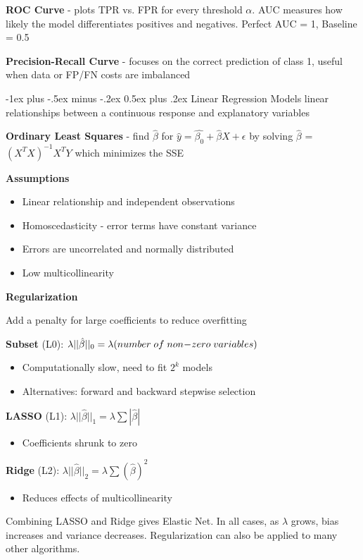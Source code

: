\documentclass[10pt,landscape]{article}
\makeatletter
\renewcommand{\section}{\@startsection{section}{1}{0mm}%
                                {-1ex plus -.5ex minus -.2ex}%
                                {0.5ex plus .2ex}%
                                {\normalfont\large\bfseries}}
\makeatother
\begin{document}
\begin{multicols}{3}
\textbf{ROC Curve} - plots TPR vs. FPR for every threshold $\alpha$. AUC measures how likely the model differentiates positives and negatives. Perfect AUC = 1, Baseline = 0.5 

\textbf{Precision-Recall Curve} - focuses on the correct prediction of class 1, useful when data or FP/FN costs are imbalanced

\section{Linear Regression}
Models linear relationships between a continuous response and explanatory variables

\textbf{Ordinary Least Squares} - find $\hat{\beta}$ for $\hat{y} = \hat{\beta_{0}} + \hat{\beta}X + \epsilon$ 
by solving $\hat{\beta}$ = $(X^{T}X)^{-1}X^{T}Y$ which minimizes the SSE 

\textbf{Assumptions}
\begin{itemize}[label={--},leftmargin=4mm]
\vspace{-1mm}
\itemsep -.4mm 
\item Linear relationship and independent observations
\item Homoscedasticity - error terms have constant variance
\item Errors are uncorrelated and normally distributed
\item Low multicollinearity
\end{itemize}
\textbf{Regularization} 

Add a penalty for large coefficients to reduce overfitting 

\textbf{Subset}  (L0): $\lambda ||\hat{\beta}||_0 = \lambda (number \;of\;non\hspace{-.7mm}-\hspace{-.7mm}zero\; variables)$ 
\begin{itemize}[label={--},leftmargin=4mm]
\vspace{-1mm}
\itemsep -.4mm 
\item Computationally slow, need to fit $2^k$ models
\item Alternatives: forward and backward stepwise selection
\end{itemize}
\textbf{LASSO}  (L1): $\lambda ||\hat{\beta}||_1 = \lambda\sum | \hat{\beta} |$
\begin{itemize}[label={--},leftmargin=4mm]
\vspace{-1mm}
\itemsep -.4mm 
\item Coefficients shrunk to zero
\end{itemize}
\textbf{Ridge}  (L2): $\lambda ||\hat{\beta}||_2 = \lambda\sum( \hat{\beta})^2$ 
\begin{itemize}[label={--},leftmargin=4mm]
\vspace{-1mm}
\itemsep -.4mm 
\item Reduces effects of multicollinearity
\end{itemize}
Combining LASSO and Ridge gives Elastic Net. In all cases, as $\lambda$ grows, bias increases and variance decreases. Regularization can also be applied to many other algorithms.


\end{multicols}
\end{document}
